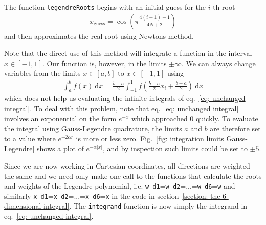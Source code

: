 \documentclass[twoside, 11pt]{article}
\renewcommand{\d}{\mathrm{d}}
\begin{document}
			The function \texttt{legendreRoots} begins with an initial guess for the $i$-th root 
			\begin{align*}
				x_\mathrm{guess} = \cos \left( \pi \frac{4(i+1) - 1}{4N + 2} \right) 
			\end{align*}
			and then approximates the real root using Newtons method. 
			
			
			Note that the direct use of this method will integrate a function in the interval $x\in[-1,1]$. Our function is, however, in the limits $\pm \infty$. We can always change variables from the limits $x \in [a, b]$ to $x \in [-1, 1]$ using
			\begin{align}
				\int_{a}^{b} f(x) \ \d x = \frac{b-a}{2} \int_{-1}^{1} f\left( \frac{b-a}{2}x_i + \frac{b+a}{2} \right) \ \d x
			\end{align}
			which does not help us evaluating the infinite integrals of eq.~\eqref{eq: unchanged integral}. To deal with this problem, note that eq.~\eqref{eq: unchanged integral} involves an exponential on the form $e^{-x}$ which approached 0 quickly. To evaluate the integral using Gauss-Legendre quadrature, the limits $a$ and $b$ are therefore set to a value where $e^{-2\alpha r}$ is more or less zero. Fig.~\ref{fig: integration limits Gauss-Legendre} shows a plot of $e^{-\alpha |x|}$, and by inspection such limits could be set to $\pm 5$. 
			
			Since we are now working in Cartesian coordinates, all directions are weighted the same and we need only make one call to the functions that calculate the roots and weights of the Legendre polynomial, i.e. \texttt{w\_d1}=\texttt{w\_d2}=...=\texttt{w\_d6}=\texttt{w} and similarly  \texttt{x\_d1}=\texttt{x\_d2}=...=\texttt{x\_d6}=\texttt{x} in the code in section~\ref{section: the 6-dimensional integral}. The \texttt{integrand} function is now simply the integrand in eq.~\eqref{eq: unchanged integral}.
			
\end{document}
